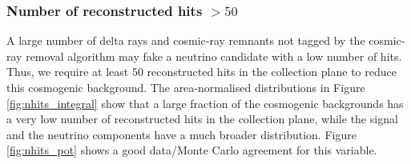 \subsubsection*{Number of reconstructed hits $> 50$} 
A large number of delta rays and cosmic-ray remnants not tagged by the cosmic-ray removal algorithm may fake a neutrino candidate with a low number of hits. Thus, we require at least 50 reconstructed hits in the collection plane to reduce this cosmogenic background. 
The area-normalised distributions in Figure \ref{fig:nhits_integral} show that a large fraction of the cosmogenic backgrounds has a very low number of reconstructed hits in the collection plane, while the signal and the neutrino components have a much broader distribution. Figure \ref{fig:nhits_pot} shows a good data/Monte Carlo agreement for this variable.

